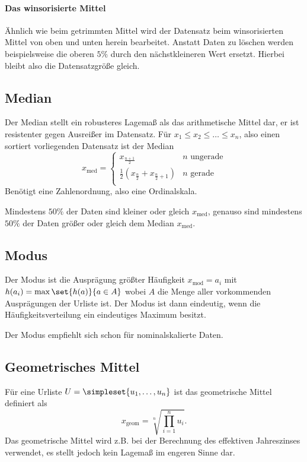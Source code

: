 \paragraph{Das winsorisierte Mittel}
Ähnlich wie beim getrimmten Mittel wird der Datensatz beim winsorisierten Mittel von oben und unten herein bearbeitet. Anstatt Daten zu löschen werden beispielsweise die oberen $5\%$ durch den nächstkleineren Wert ersetzt. Hierbei bleibt also die Datensatzgröße gleich.

\subsection{Median}
Der Median stellt ein robusteres Lagemaß als das arithmetische Mittel dar, er ist resistenter gegen Ausreißer im Datensatz.
Für $x_1\leq x_2\leq\ldots\leq x_n$, also einen sortiert vorliegenden Datensatz ist der Median
\begin{equation*}
	x_{\operatorname{med}}=
	\begin{cases}
		x_{\frac{n+1}2}& \text{$n$ ungerade}\\
		\frac 12 (x_{\frac n2}+x_{\frac n2 +1})& \text{$n$ gerade}\\
	\end{cases}
\end{equation*}
Benötigt eine Zahlenordnung, also eine Ordinalskala.

Mindestens $50\%$ der Daten sind kleiner oder gleich $x_{\operatorname{med}}$, genauso sind mindestens $50\%$ der Daten größer oder gleich dem Median $x_{\operatorname{med}}$.

\subsection{Modus}
Der Modus ist die Ausprägung größter Häufigkeit $x_{\operatorname{mod}}=a_i$ mit $h(a_i)=\max \set{h(a)}{a\in A}$ wobei $A$ die Menge aller vorkommenden Ausprägungen der Urliste ist.
Der Modus ist dann eindeutig, wenn die Häufigkeitsverteilung ein eindeutiges Maximum besitzt.

Der Modus empfiehlt sich schon für nominalskalierte Daten.



\subsection{Geometrisches Mittel}
Für eine Urliste $U=\simpleset{u_1,\ldots,u_n}$ ist das geometrische Mittel definiert als
\begin{equation*}
	x_{\operatorname{geom}}=\sqrt[n]{\prod_{i=1}^n u_i}.
\end{equation*}
Das geometrische Mittel wird z.B. bei der Berechnung des effektiven Jahreszinses verwendet, es stellt jedoch kein Lagemaß im engeren Sinne dar.

